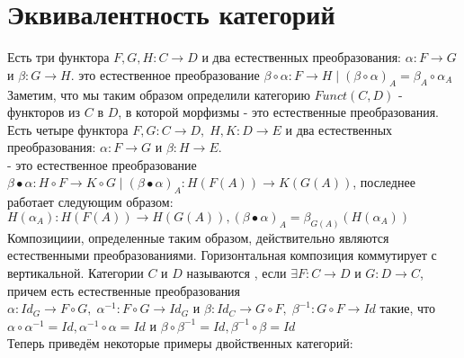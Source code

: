 \documentclass[a4paper]{article}
\theoremstyle{indented}
\theoremstyle{definition}
\theoremstyle{remark}
\DeclareMathOperator{\ra}{\rightarrow}
\begin{document}
\section{Эквивалентность категорий}
 Есть три функтора $F, G, H: C \ra D$ и два естественных преобразования: $\alpha: F \ra G$ и $\beta: G \ra H$.   это естественное преобразование $\beta \circ \alpha : F \ra H\;|\;(\beta \circ \alpha)_A = \beta_A \circ \alpha_A$
\remark Заметим, что мы таким образом определили категорию $Funct(C, D)$ - функторов из $C$ в $D$, в которой морфизмы - это естественные преобразования.
 Есть четыре функтора $F, G: C \ra D, \;H, K: D \ra E$ и два естественных преобразования: $\alpha: F \ra G$ и $\beta: H \ra E$. \\
 - это естественное преобразование $\beta \bullet \alpha: H \circ F \ra K \circ G\;|\;(\beta \bullet \alpha)_A : H(F(A)) \ra K(G(A))$, последнее работает следующим образом: $H(\alpha_A): H(F(A)) \ra H(G(A)), (\beta \bullet \alpha)_A = \beta_{G(A)}(H(\alpha_A))$
\exer Композициии, определенные таким образом, действительно являются естественными преобразованиями.
\exer Горизонтальная композиция коммутирует с вертикальной.
 Категории $C$ и $D$ называются , если $\exists F: C \ra D$ и $G: D \ra C$, причем есть естественные преобразования \\
$\alpha: Id_G \ra F \circ G,\; \alpha^{-1}: F \circ G \ra Id_G$ и $\beta: Id_C \ra G \circ F,\; \beta^{-1}: G \circ F \ra Id$ такие, что \\
$\alpha \circ \alpha^{-1} = Id, \alpha^{-1} \circ \alpha = Id$ и $\beta \circ \beta^{-1} = Id, \beta^{-1} \circ \beta = Id$
\\Теперь приведём некоторые примеры двойственных категорий:
\end{document}

